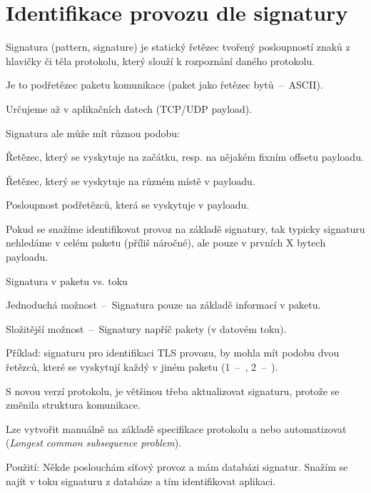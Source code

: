
\section{Identifikace provozu dle signatury}

\begin{compactitem}
    \item Signatura (pattern, signature) je statický řetězec tvořený posloupností znaků z hlavičky či těla protokolu, který slouží k rozpoznání daného protokolu. \begin{compactitem}
        \item Je to  podřetězec paketu komunikace (paket jako řetězec bytů~--~ASCII).
        \item Určujeme až v aplikačních datech (TCP/UDP payload).
    \end{compactitem}
    \item Signatura ale může mít různou podobu: \begin{compactitem}
        \item Řetězec, který se vyskytuje na začátku, resp. na nějakém fixním offsetu payloadu.
        \item Řetězec, který se vyskytuje na různém místě v payloadu.
        \item Posloupnost podřetězců, která se vyskytuje v payloadu.
    \end{compactitem}
    \item Pokud se snažíme identifikovat provoz na základě signatury, tak typicky signaturu nehledáme v celém paketu (příliš náročné), ale pouze v prvních X bytech payloadu.
    \item Signatura v paketu vs. toku \begin{compactitem}
        \item Jednoduchá možnost~--~Signatura pouze na základě informací v paketu.
        \item Složitější možnost~--~Signatury napříč pakety (v datovém toku). \begin{compactitem}
            \item Příklad: signaturu pro identifikaci TLS provozu, by mohla mít podobu dvou řetězců, které se vyskytují každý v jiném paketu (1~--~, 2~--~).
        \end{compactitem}
    \end{compactitem}
    \item S novou verzí protokolu, je většinou třeba aktualizovat signaturu, protože se změnila struktura komunikace.
    \item Lze vytvořit manuálně na základě specifikace protokolu a nebo automatizovat (\textit{Longest common subsequence problem}).
    \item Použití: Někde poslouchám síťový provoz a mám databázi signatur. Snažím se najít v toku signaturu z databáze a tím identifikovat aplikaci.
\end{compactitem}


